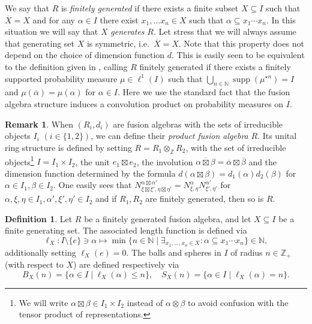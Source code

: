 \documentclass[11 pt, leqno]{amsart}
\newcommand{\ov}{\overline}
\newcommand{\NN}{\mathbb{N}}
\newcommand{\ZZ}{\mathbb{Z}}
\DeclareMathOperator{\supp}{supp}
\theoremstyle{definition}
\newtheorem{remark}[theorem]{Remark}
\newtheorem{definition}[theorem]{Definition}
\numberwithin{equation}{section}
\begin{document}
We say that $R$ is \emph{finitely generated} if there exists a finite  subset $X\subseteq I$ such that $\ov{X}=X$ and for any $\alpha\in I$ there exist $x_1,\dotsc x_n\in X$ such that $\alpha\subseteq x_1\cdots x_n$. In this situation we will say that $X$ \emph{generates} $R$. Let stress that we will always assume that generating set $X$ is symmetric, i.e.~$\ov{X}=X$. Note that this property does not depend on the choice of dimension function $d$.
This is easily seen to be equivalent to the definition given in \cite[Section 3]{Kyed}, calling $R$ finitely generated if  there exists a finitely supported probability measure $\mu\in \ell^1(I)$ such that $\bigcup_{n\in\NN}\supp (\mu^{\star n})=I$ and $\mu(\ov{\alpha})=\mu(\alpha)$ for $\alpha\in I$. Here we use the standard fact that the fusion algebra structure induces a convolution product on probability measures on $I$.

\begin{remark}\label{rem:product}
When $(R_i,d_i)$ are fusion algebras with the sets of irreducible objects $I_i$ $(i\in \{1,2\})$, we can define their \emph{product fusion algebra} $R$. Its unital ring structure is defined by setting $R=R_1\otimes_{\ZZ} R_2$, with the set of irreducible objects\footnote{We will write $\alpha\boxtimes \beta\in I_1\times I_2$ instead of $\alpha\otimes \beta$ to avoid confusion with the tensor product of representations.} $I=I_1\times I_2$, the unit $e_1\boxtimes e_2$, the involution $\ov{\alpha\boxtimes \beta}=\ov{\alpha}\boxtimes \ov{\beta}$ and the dimension function determined by the formula $d(\alpha\boxtimes \beta)=d_1(\alpha)d_2(\beta)$ for $\alpha\in I_1,\beta\in I_2$. One easily sees that $N^{\alpha\boxtimes \alpha'}_{\xi\boxtimes \xi',\eta\boxtimes \eta'}=N^{\alpha}_{\xi,\eta} N^{\alpha'}_{\xi',\eta'}$ for $\alpha,\xi,\eta\in I_1,\alpha',\xi',\eta'\in I_2$ and if $R_1,R_2$ are finitely generated, then so is $R$.
\end{remark}

\begin{definition} \label{def:length}
	Let $R$ be a finitely generated fusion algebra, and let  $X\subseteq I$ be a finite generating set. The associated length function is defined via%
	\[
	\ell_X\colon I\setminus\{e\}\ni \alpha\mapsto \min\{n \in \mathbb{N}\mid  \exists_{x_1,\dotsc,x_n \in X} \colon \alpha\subseteq x_1\cdots x_n \}\in \NN,
	\]
	additionally setting $\ell_X(e)=0$. %
The balls and spheres in $I$ of radius $n \in \ZZ_+$ (with respect to $X$) are defined respectively via
	\[
	B_X(n)=\{\alpha\in I\mid  \ell_X(\alpha)\le n\},\quad
	S_X(n)=\{\alpha\in I\mid \ell_X(\alpha)=n\}.
	\]
\end{definition}
\end{document}
